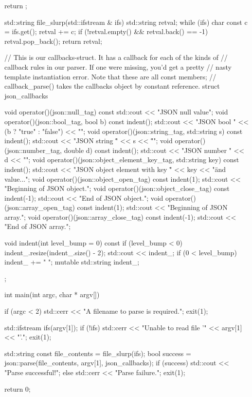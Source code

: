 \begin{code}
{{        return {};
    }

}

std::string file_slurp(std::ifstream & ifs)
{
    std::string retval;
    while (ifs) {
        char const c = ifs.get();
        retval += c;
    }
    if (!retval.empty() && retval.back() == -1)
        retval.pop_back();
    return retval;
}

// This is our callbacks-struct.  It has a callback for each of the kinds of
// callback rules in our parser.  If one were missing, you'd get a pretty
// nasty template instantiation error.  Note that these are all const members;
// callback_parse() takes the callbacks object by constant reference.
struct json_callbacks
{
    void operator()(json::null_tag) const { std::cout << "JSON null value\n"; }
    void operator()(json::bool_tag, bool b) const
    {
        indent();
        std::cout << "JSON bool " << (b ? "true" : "false") << "\n";
    }
    void operator()(json::string_tag, std::string s) const
    {
        indent();
        std::cout << "JSON string \"" << s << "\"\n";
    }
    void operator()(json::number_tag, double d) const
    {
        indent();
        std::cout << "JSON number " << d << "\n";
    }
    void operator()(json::object_element_key_tag, std::string key) const
    {
        indent();
        std::cout << "JSON object element with key \"" << key
                  << "\" and value...\n";
    }
    void operator()(json::object_open_tag) const
    {
        indent(1);
        std::cout << "Beginning of JSON object.\n";
    }
    void operator()(json::object_close_tag) const
    {
        indent(-1);
        std::cout << "End of JSON object.\n";
    }
    void operator()(json::array_open_tag) const
    {
        indent(1);
        std::cout << "Beginning of JSON array.\n";
    }
    void operator()(json::array_close_tag) const
    {
        indent(-1);
        std::cout << "End of JSON array.\n";
    }

    void indent(int level_bump = 0) const
    {
        if (level_bump < 0)
            indent_.resize(indent_.size() - 2);
        std::cout << indent_;
        if (0 < level_bump)
            indent_ += "  ";
    }
    mutable std::string indent_;
};

int main(int argc, char * argv[])
{
    if (argc < 2) {
        std::cerr << "A filename to parse is required.\n";
        exit(1);
    }

    std::ifstream ifs(argv[1]);
    if (!ifs) {
        std::cerr << "Unable to read file '" << argv[1] << "'.\n";
        exit(1);
    }

    std::string const file_contents = file_slurp(ifs);
    bool success = json::parse(file_contents, argv[1], json_callbacks{});
    if (success) {
        std::cout << "Parse successful!\n";
    } else {
        std::cerr << "Parse failure.\n";
        exit(1);
    }

    return 0;
}
\end{code}


